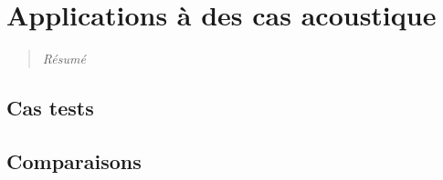 \chapter{Applications à des cas acoustique}
\label{chap:ch7}
\begin{quotation}
\textit{Résumé}
\end{quotation}
\minitoc
\newpage
 
\section{Cas tests} 
\section{Comparaisons}
